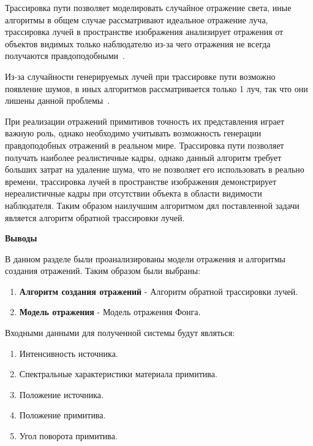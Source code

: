 Трассировка пути позволяет моделировать случайное отражение света, иные алгоритмы в общем случае рассматривают идеальное отражение луча,
трассировка лучей в пространстве изображения анализирует отражения от  объектов видимых только наблюдателю из-за чего отражения не всегда получаются правдоподобными~\cite{SSR,path_tracing}.

Из-за случайности генерируемых лучей при трассировке пути возможно появление шумов, в иных алгоритмов рассматривается только 1 луч, так что они лишены данной проблемы~\cite{path_tracing}.




При реализации отражений примитивов точность их представления играет важную роль, однако необходимо учитывать возможность генерации правдоподобных отражений
в реальном мире. Трассировка пути позволяет получать наиболее реалистичные кадры, однако данный алгоритм требует больших затрат на удаление шума, что
не позволяет его использовать в реально времени, трассировка лучей в пространстве изображения демонстрирует нереалистичные кадры при 
отсутствии объекта в области видимости наблюдателя. Таким образом наилучшим алгоритмом дял поставленной задачи является алгоритм обратной трассировки лучей.


\textbf{Выводы}

В данном разделе были проанализированы модели отражения и алгоритмы создания отражений.
Таким образом были выбраны:
\begin{enumerate}
	\item \textbf{Алгоритм создания отражений} - Алгоритм обратной трассировки лучей.
	\item \textbf{Модель отражения} - Модель отражения Фонга.
\end{enumerate}


Входными данными для полученной системы будут являться:
\begin{enumerate}
	\item Интенсивность источника.
	\item Спектральные характеристики материала примитива.
	\item Положение источника.
	\item Положение примитива.
	\item Угол поворота примитива.
\end{enumerate}